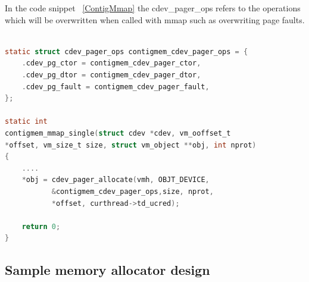 In the code snippet ~\ref{ContigMmap} the cdev\_pager\_ops refers to the operations which will be overwritten 
when called with mmap such as overwriting page faults.


\begin{lstlisting}[language=C, caption=Contigmem driver mmap , label=ContigMmap]

static struct cdev_pager_ops contigmem_cdev_pager_ops = {
	.cdev_pg_ctor = contigmem_cdev_pager_ctor,
	.cdev_pg_dtor = contigmem_cdev_pager_dtor,
	.cdev_pg_fault = contigmem_cdev_pager_fault,
};

static int
contigmem_mmap_single(struct cdev *cdev, vm_ooffset_t 
*offset, vm_size_t size, struct vm_object **obj, int nprot)
{
    ....
	*obj = cdev_pager_allocate(vmh, OBJT_DEVICE, 
           &contigmem_cdev_pager_ops,size, nprot, 
           *offset, curthread->td_ucred);

	return 0;
}
\end{lstlisting}



\subsection{Sample memory allocator design}

